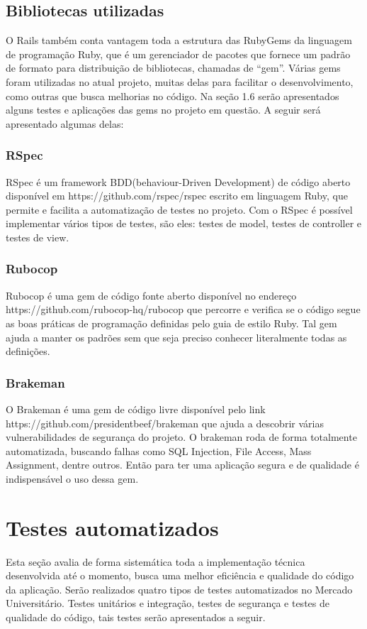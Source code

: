 \subsection{Bibliotecas utilizadas}
O Rails também conta vantagem toda a estrutura das RubyGems da linguagem de programação Ruby, que é um gerenciador de pacotes que fornece um padrão de formato para distribuição de bibliotecas, chamadas de “gem”. Várias gems foram utilizadas no atual projeto, muitas delas para facilitar o desenvolvimento, como outras que busca melhorias no código. Na seção 1.6 serão apresentados alguns testes e aplicações das gems no projeto em questão. A seguir será apresentado algumas delas:
\subsubsection{RSpec}
RSpec é um framework BDD(behaviour-Driven Development) de código aberto disponível em https://github.com/rspec/rspec escrito em linguagem Ruby, que permite e facilita a automatização de testes no projeto. Com o RSpec é possível implementar vários tipos de testes, são eles: testes de model, testes de controller e testes de view.
\subsubsection{Rubocop}
Rubocop é uma gem de código fonte aberto disponível no endereço https://github.com/rubocop-hq/rubocop que percorre e verifica se o código segue as boas práticas de programação definidas pelo guia de estilo Ruby. Tal gem ajuda a manter os padrões sem que seja preciso conhecer literalmente todas as definições.
\subsubsection{Brakeman}
O Brakeman é uma gem de código livre disponível pelo link https://github.com/presidentbeef/brakeman que ajuda a descobrir várias vulnerabilidades de segurança do projeto. O brakeman roda de forma totalmente automatizada, buscando falhas como SQL Injection, File Access, Mass Assignment, dentre outros. Então para ter uma aplicação segura e de qualidade é indispensável o uso dessa gem.

\section{Testes automatizados}
Esta seção avalia de forma sistemática toda a implementação técnica desenvolvida até o momento, busca uma melhor eficiência e qualidade do código da aplicação. Serão realizados quatro tipos de testes automatizados no Mercado Universitário. Testes unitários e integração, testes de segurança e testes de qualidade do código, tais testes serão apresentados a seguir.
